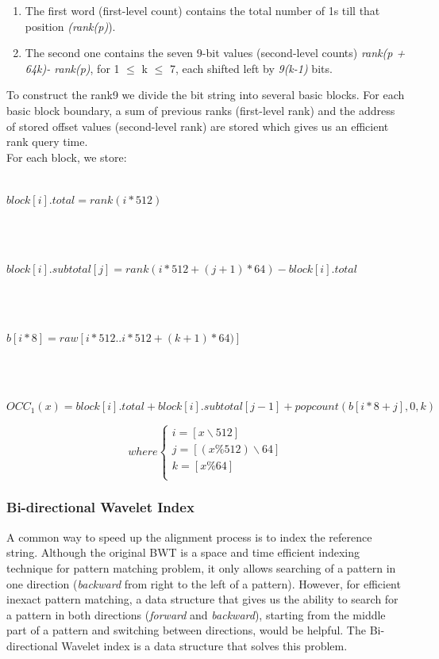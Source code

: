 \documentclass[11pt,a4paper]{report}
\begin{document}
\begin{enumerate}

	\item The first word (first-level count) contains the 
	total number of 1s till that position \emph{(rank(p)}).
	
	\item The second one contains the seven 9-bit values 
	(second-level counts) \emph{rank(p + 64k)- rank(p)}, 
	for 1 $\leq$ k $\leq$ 7, each shifted left by \emph
	{9(k-1)} bits.
	
\end{enumerate}

To construct the rank9  we divide the bit string into 
several basic blocks. For each basic block boundary, 
a sum of previous ranks (first-level rank) and the 
address of stored offset values (second-level rank) 
are stored which gives us an efficient rank query 
time. \\

For each block, we store:\\\\
\centerline{$ block[i].total= rank(i*512)$}\\\\
\centerline{$ block[i].subtotal[j]= rank(i*512 + (j+1)*64)-block[i].total$}\\\\
\centerline{$ b[i*8]=raw[i*512..i*512+(k+1)*64)] $}\\\\
\centerline{$ OCC_{1}(x)=block[i].total+block[i].subtotal[j-1]+popcount(b[i*8 + j],0,k)$}



\[ where
\begin{cases}
	i=[ x \backslash 512 ]\\
	j=[(x \% 512 )\backslash 64 ]\\
	k=[ x \% 64  ]\\
\end{cases}
\]




\subsubsection{Bi-directional Wavelet Index}
\label{Bi-directional Wavelet Index}

A common way to speed up the alignment process is to index the reference string. 
Although the original BWT is a space and time efficient indexing technique for 
pattern matching problem, it only allows  searching of a pattern in one 
direction (\emph{backward} from right to the left of a pattern). 
However, for efficient inexact pattern matching, a data structure that gives us 
the ability to search for a pattern in both directions (\emph{forward}
and \emph{backward}), 
starting from the middle part of a pattern and switching between
directions, would 
be helpful. The Bi-directional Wavelet index is a data structure that solves 
this problem.
\end{document}
